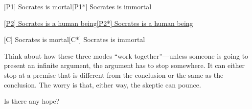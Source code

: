 \documentclass[11pt]{article}
\begin{document}
[P1] Socrates is mortal\hspace*{42.5mm}[P1*] Socrates is immortal
\vspace*{1mm}

\underline{[P2] Socrates is a human being}\hspace*{30mm}\underline{[P2*] Socrates is a human being}
\vspace*{1mm}

[C] Socrates is mortal\hspace*{43.5mm}[C*] Socrates is immortal
\vspace*{4mm}

\noindent Think about how these three modes ``work together''---unless someone is going to present an infinite argument, the argument has to stop somewhere. It can either stop at a premise that is different from the conclusion or the same as the conclusion. The worry is that, either way, the skeptic can pounce.
\vspace*{2mm}

\noindent Is there any hope?
\end{document}
